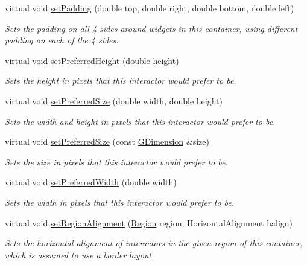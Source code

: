 \begin{DoxyCompactItemize}
virtual void \mbox{\hyperlink{classGContainer_a9adbf36914b59c2ed3ed9aebe7adfc7e}{set\+Padding}} (double top, double right, double bottom, double left)
\begin{DoxyCompactList}\small\item\em Sets the padding on all 4 sides around widgets in this container, using different padding on each of the 4 sides. \end{DoxyCompactList}\item 
virtual void \mbox{\hyperlink{classGInteractor_a1ab987704fce32098706c6f00fb08218}{set\+Preferred\+Height}} (double height)
\begin{DoxyCompactList}\small\item\em Sets the height in pixels that this interactor would prefer to be. \end{DoxyCompactList}\item 
virtual void \mbox{\hyperlink{classGInteractor_a042c5ae19430d765ef552371cae3632c}{set\+Preferred\+Size}} (double width, double height)
\begin{DoxyCompactList}\small\item\em Sets the width and height in pixels that this interactor would prefer to be. \end{DoxyCompactList}\item 
virtual void \mbox{\hyperlink{classGInteractor_aa22d9be4bc0e078bb0ea69b0fc9d7c75}{set\+Preferred\+Size}} (const \mbox{\hyperlink{classGDimension}{G\+Dimension}} \&size)
\begin{DoxyCompactList}\small\item\em Sets the size in pixels that this interactor would prefer to be. \end{DoxyCompactList}\item 
virtual void \mbox{\hyperlink{classGInteractor_a3db429ab2fa52efd187eec0ed8cdd9f2}{set\+Preferred\+Width}} (double width)
\begin{DoxyCompactList}\small\item\em Sets the width in pixels that this interactor would prefer to be. \end{DoxyCompactList}\item 
virtual void \mbox{\hyperlink{classGContainer_a96e9f5593c0193bbdc7ae99945b9cf5f}{set\+Region\+Alignment}} (\mbox{\hyperlink{classGContainer_a81a01a86de31071a92e6cce0bab9bc4b}{Region}} region, Horizontal\+Alignment halign)
\begin{DoxyCompactList}\small\item\em Sets the horizontal alignment of interactors in the given region of this container, which is assumed to use a border layout. \end{DoxyCompactList}\item 

\end{DoxyCompactItemize}
